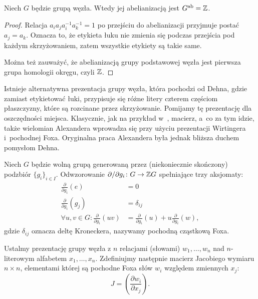 \begin{corollary}
    \label{prop:knot_group_abelianisation}
    Niech $G$ będzie grupą węzła.
    Wtedy jej abelianizacją jest $G^{\operatorname{ab}} = \mathbb Z$.
\end{corollary}

\begin{proof}
    Relacja $a_ia_ja_i^{-1}a_k^{-1}=1$ po przejściu do abelianizacji przyjmuje postać $a_j = a_k$.
    Oznacza to, że etykieta łuku nie zmienia się podczas przejścia pod każdym skrzyżowaniem, zatem wszystkie etykiety są takie same.

    Można też zauważyć, że abelianizacją grupy podstawowej węzła jest pierwsza grupa homologii okręgu, czyli $\mathbb Z$.
\end{proof}

Istnieje alternatywna prezentacja grupy węzła, która pochodzi od Dehna, gdzie zamiast etykietować łuki, przypisuje się różne litery czterem częściom płaszczyzny, które są rozcinane przez skrzyżowanie.
Pomijamy tę prezentację dla oszczędności miejsca.
Klasycznie, jak na przykład w~\cite{crowell63}, macierz, a~co za tym idzie, także wielomian Alexandera wprowadza się przy użyciu prezentacji Wirtingera i~pochodnej Foxa.
Oryginalna praca Alexandera była jednak bliższa duchem pomysłom Dehna.

\begin{definition}
    Niech $G$ będzie wolną grupą generowaną przez (niekoniecznie skończony) podzbiór $\{g_i\}_{i \in I}$.
    Odwzorowanie $\partial/\partial g_i \colon G \to \mathbb Z G$ spełniające trzy aksjomaty:
    \begin{align}
        \frac{\partial}{\partial g_i} (e) & = 0 \\
        \frac{\partial}{\partial g_i} (g_j) & = \delta_{ij} \\
        \forall u, v \in G : \frac{\partial}{\partial g_i} (uv) & = \frac{\partial}{\partial g_i}(u) + u \frac{\partial}{\partial g_i} (w),
    \end{align}
    gdzie $\delta_{ij}$ oznacza deltę Kroneckera, nazywamy pochodną cząstkową Foxa.
\end{definition}

Ustalmy prezentację grupy węzła z $n$ relacjami (słowami) $w_1, \ldots, w_n$ nad $n$-literowym alfabetem $x_1, \ldots, x_n$.
Zdefiniujmy następnie macierz Jacobiego wymiaru $n \times n$, elementami której są pochodne Foxa słów $w_i$ względem zmiennych $x_j$:
\begin{equation}
    J = \left(\frac{\partial w_i}{\partial x_j}\right).
\end{equation}

